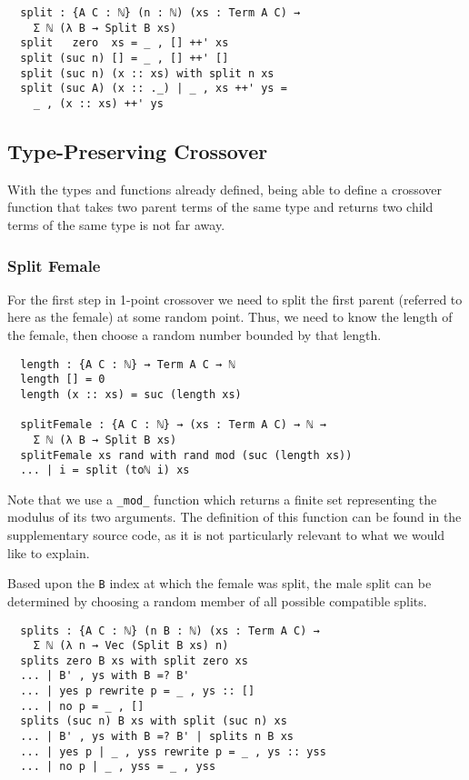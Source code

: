 \documentclass{acm_proc_article-sp}
\begin{document}
\begin{verbatim}
  split : {A C : ℕ} (n : ℕ) (xs : Term A C) →
    Σ ℕ (λ B → Split B xs)
  split   zero  xs = _ , [] ++' xs
  split (suc n) [] = _ , [] ++' []
  split (suc n) (x :: xs) with split n xs
  split (suc A) (x :: ._) | _ , xs ++' ys =
    _ , (x :: xs) ++' ys
\end{verbatim}

\subsection{Type-Preserving Crossover}

With the types and functions already defined, being able to define a
crossover function that takes two parent terms of the same type and
returns two child terms of the same type is not far away.

\subsubsection{Split Female}

For the first step in 1-point crossover we need to split the first
parent (referred to here as the female) at some random point. Thus, we
need to know the length of the female, then choose a random number
bounded by that length.

\begin{verbatim}
  length : {A C : ℕ} → Term A C → ℕ
  length [] = 0
  length (x :: xs) = suc (length xs)

  splitFemale : {A C : ℕ} → (xs : Term A C) → ℕ →
    Σ ℕ (λ B → Split B xs)
  splitFemale xs rand with rand mod (suc (length xs))
  ... | i = split (toℕ i) xs
\end{verbatim}

Note that we use a \texttt{\_mod\_} function which returns a finite set
representing the modulus of its two arguments. The definition of this
function can be found in the supplementary source code, as it is not
particularly relevant to what we would like to explain.

Based upon the \texttt{B} index at which the female was split, the
male split can be determined by choosing a random member of all
possible compatible splits.

\begin{verbatim}
  splits : {A C : ℕ} (n B : ℕ) (xs : Term A C) →
    Σ ℕ (λ n → Vec (Split B xs) n)
  splits zero B xs with split zero xs
  ... | B' , ys with B =? B'
  ... | yes p rewrite p = _ , ys :: []
  ... | no p = _ , []
  splits (suc n) B xs with split (suc n) xs
  ... | B' , ys with B =? B' | splits n B xs
  ... | yes p | _ , yss rewrite p = _ , ys :: yss
  ... | no p | _ , yss = _ , yss
\end{verbatim}
\end{document}

